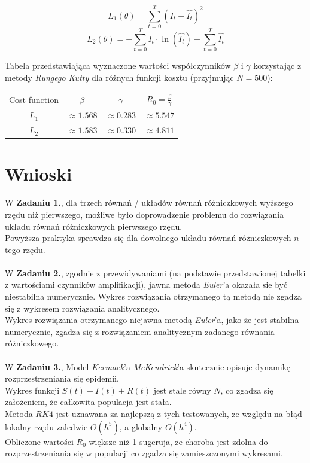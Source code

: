 \documentclass{article}
\begin{document}
$$L_1(\theta) = \sum_{t=0}^{T} (I_t - \hat{I_t})^2$$
$$L_2(\theta) = -\sum_{t=0}^{T} I_t\cdot \ln(\hat{I_t}) + 
\sum_{t=0}^{T} \hat{I_t}$$

Tabela przedstawiająca wyznaczone wartości współczynników $\beta$ i $\gamma$
korzystając z metody \textit{Rungego Kutty} dla różnych
funkcji kosztu (przyjmując $N=500$):
\begin{center}
  \begin{tabular}{c c c c} 
   Cost function & $\beta$ & $\gamma$ & $R_0 = \frac{\beta}{\gamma}$\\
   $L_1$ & $\approx1.568$ & $\approx0.283$ & $\approx5.547$\\
   $L_2$ & $\approx1.583$ & $\approx0.330$ & $\approx4.811$
  \end{tabular}
\end{center}
\newpage
\section*{Wnioski}
\null\quad
W \textbf{Zadaniu 1.}, dla trzech równań / układów równań różniczkowych
wyższego rzędu niż pierwszego, możliwe było doprowadzenie problemu do rozwiązania
układu równań różniczkowych pierwszego rzędu.\\
Powyższa praktyka sprawdza się dla dowolnego układu równań różniczkowych $n$-tego rzędu.\\\\
\null\quad 
W \textbf{Zadaniu 2.}, zgodnie z przewidywaniami (na podstawie przedstawionej tabelki z
wartościami czynników amplifikacji), jawna metoda \textit{Euler}'a okazała sie być niestabilna
numerycznie. Wykres rozwiązania otrzymanego tą metodą nie zgadza się z wykresem rozwiązania analitycznego.\\
Wykres rozwiązania otrzymanego niejawna metodą \textit{Euler}'a, jako że jest stabilna numerycznie, 
zgadza się z rozwiązaniem analitycznym zadanego równania różniczkowego.\\\\
\null\quad
W \textbf{Zadaniu 3.}, Model \textit{Kermack}’a-\textit{McKendrick}'a skutecznie opisuje dynamikę
rozprzestrzeniania się epidemii.\\
Wykres funkcji $S(t) + I(t) + R(t)$ jest stale równy $N$, co zgadza się
założeniem, że całkowita populacja jest stała.\\ Metoda $RK4$ jest uznawana za najlepszą z tych
testowanych, ze względu na błąd lokalny rzędu zaledwie $O(h^5)$, a globalny $O(h^4)$.\\
Obliczone wartości $R_0$ większe niż 1 sugeruja, że choroba jest zdolna do rozprzestrzeniania
się w populacji co zgadza się zamieszczonymi wykresami. \\
\end{document}

